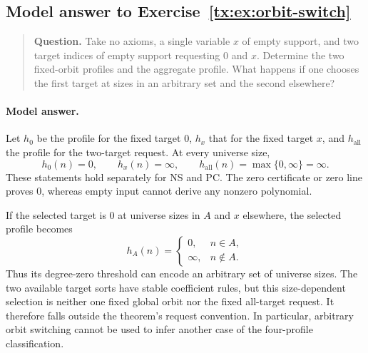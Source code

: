 \par


\begin{samepage}

\subsection*{Model answer to Exercise~\ref{tx:ex:orbit-switch}}\label{tx:ans:orbit-switch}

\begin{quote}\small\textbf{Question.} Take no axioms, a single variable $x$ of empty support, and two target
indices of empty support requesting $0$ and $x$. Determine the two
fixed-orbit profiles and the aggregate profile. What happens if one
chooses the first target at sizes in an arbitrary set and the second
elsewhere?
\end{quote}

\paragraph{Model answer.}
Let \(h_0\) be the profile for the fixed target \(0\), \(h_x\) that
for the fixed target \(x\), and \(h_{\mathrm{all}}\) the profile for
the two-target request. At every universe size,
\[
            h_0(n)=0,\qquad h_x(n)=\infty,\qquad
            h_{\mathrm{all}}(n)=\max\{0,\infty\}=\infty.
\]
These statements hold separately for NS and PC. The zero certificate
or zero line proves \(0\), whereas empty input cannot derive any
nonzero polynomial.
\end{samepage}

If the selected target is \(0\) at universe sizes in \(A\) and \(x\) elsewhere,
the selected profile becomes
\[
 h_A(n)=
 \begin{cases}0,&n\in A,\\ \infty,&n\notin A.\end{cases}
\]
Thus its degree-zero threshold can encode an arbitrary set of universe sizes.
The two available target sorts have stable coefficient rules, but
this size-dependent selection is neither one fixed global orbit nor
the fixed all-target request. It therefore falls outside the theorem's
request convention. In particular, arbitrary orbit switching cannot
be used to infer another case of the four-profile classification.


\par


